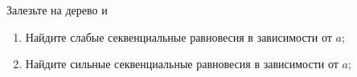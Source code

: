 \begin{problem}
\begin{source}
\cite{colell:mt}
\end{source}
Залезьте на дерево и


\begin{enumerate}
\item Найдите слабые секвенциальные равновесия в зависимости от  $a$;\par
\item Найдите сильные секвенциальные равновесия в зависимости от  $a$;
\end{enumerate}


\begin{sol}

\end{sol}
\end{problem}







